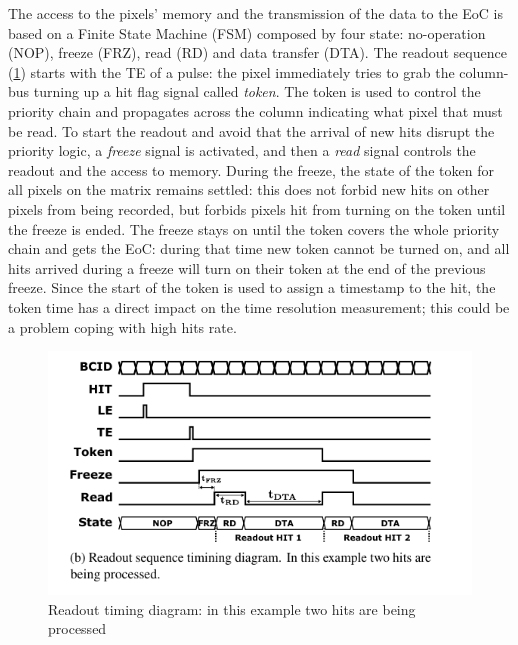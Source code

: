     The access to the pixels' memory and the transmission of the data to the EoC is based on a Finite State Machine (FSM) composed by four state: no-operation (NOP), freeze (FRZ), read (RD) and data transfer (DTA). The readout sequence (\ref{fig:readout_schematics}) starts with the TE of a pulse: the pixel immediately tries to grab the column-bus turning up a hit flag signal called \textit{token}.   
    The token is used to control the priority chain and propagates across the column indicating what pixel that must be read. To start the readout and avoid that the arrival of new hits disrupt the priority logic, a \textit{freeze} signal is activated, and then a \textit{read} signal controls the readout and the access to memory.
    During the freeze, the state of the token for all pixels on the matrix remains settled: this does not forbid new hits on other pixels from being recorded, but forbids pixels hit from turning on the token until the freeze is ended. 
    The freeze stays on until the token covers the whole priority chain and gets the EoC: during that time new token cannot be turned on, and all hits arrived during a freeze will turn on their token at the end of the previous freeze.  
    Since the start of the token is used to assign a timestamp to the hit, the token time has a direct impact on the time resolution measurement; this could be a problem coping with high hits rate. 
    \begin{figure}[h!]
        \centering
        \includegraphics[width=.5\linewidth]{figures/Monopix1/readout_timing.png}
        \caption{Readout timing diagram: in this example two hits are being processed}
        \label{fig:readout_schematics}
    \end{figure}

